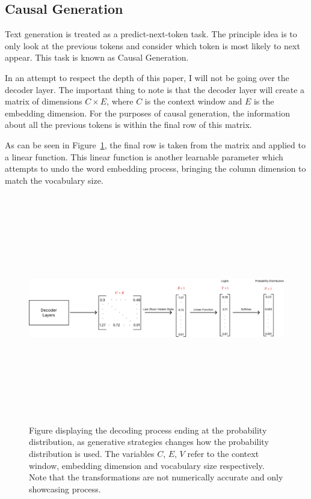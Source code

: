 \documentclass{l4proj}
\theoremstyle{definition}
\begin{document}
    \subsection{Causal Generation}
        \label{sec:decoder-generation}
        Text generation is treated as a predict-next-token task. The principle idea is to only look at the previous tokens and consider which token is most likely to next appear. This task is known as Causal Generation.

        In an attempt to respect the depth of this paper, I will not be going over the decoder layer. The important thing to note is that the decoder layer will create a matrix of dimensions $C \times E$, where $C$ is the context window and $E$ is the embedding dimension. For the purposes of causal generation, the information about all the previous tokens is within the final row of this matrix.

        As can be seen in Figure~\ref{fig:decoding-process}, the final row is taken from the matrix and applied to a linear function. This linear function is another learnable parameter which attempts to undo the word embedding process, bringing the column dimension to match the vocabulary size. 

        \begin{figure}[h]
            \centering
            \includegraphics[height=10cm, width=1\linewidth, keepaspectratio]{images/background/decoding-process.pdf}
            \caption{Figure displaying the decoding process ending at the probability distribution, as generative strategies changes how the probability distribution is used. The variables $C$, $E$, $V$ refer to the context window, embedding dimension and vocabulary size respectively. Note that the transformations are not numerically accurate and only showcasing process.}
            \label{fig:decoding-process} 
        \end{figure}
\end{document}

